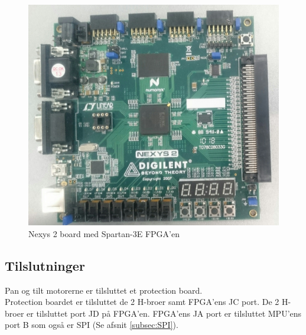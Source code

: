 \begin{figure}[!ht]
	\begin{center}
		\includegraphics[scale=0.1, angle =0]{Billeder/Nexys2Board.JPG}
	\end{center}
\caption{Nexys 2 board med Spartan-3E FPGA'en}
\label{fig:Nexys2Board}
\end{figure}

\subsection{Tilslutninger}
Pan og tilt motorerne er tilsluttet et protection board.\\
Protection boardet er tilsluttet de 2 H-broer samt FPGA'ens JC port.
De 2 H-broer er tilsluttet port JD på FPGA'en.
FPGA'ens JA port er tilsluttet MPU'ens port B som også er SPI (Se afsnit \ref{subsec:SPI}).

